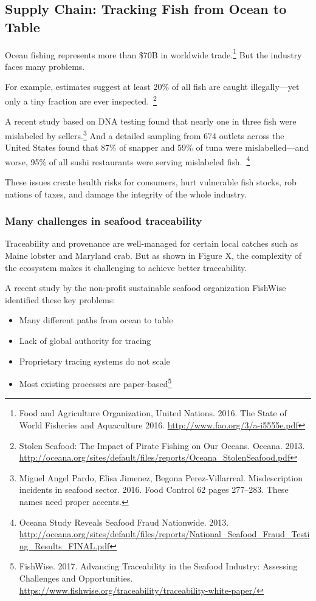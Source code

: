\subsection{Supply Chain: Tracking Fish from Ocean to Table}

Ocean fishing represents more than \$70B in worldwide trade.\footnote{
Food and Agriculture Organization, United Nations. 2016. The State of
World Fisheries and Aquaculture
2016. \url{http://www.fao.org/3/a-i5555e.pdf}} But the industry faces
many problems.

For example, estimates suggest at least 20\% of all fish are caught
illegally---yet only a tiny fraction are ever inspected.~\footnote{
Stolen Seafood: The Impact of Pirate Fishing on Our
Oceans. Oceana. 2013. \url{http://oceana.org/sites/default/files/reports/Oceana_StolenSeafood.pdf}}

A recent study based on DNA testing found that nearly one in three fish
were mislabeled by sellers.\footnote{ Miguel Angel Pardo, Elisa
Jimenez, Begona Perez-Villarreal. Misdescription incidents in
seafood sector. 2016. Food Control 62 pages 277--283. These names need
proper accents.}  And a detailed sampling from 674 outlets across the
United States found that 87\% of snapper and 59\% of tuna were
mislabelled---and worse, 95\% of all sushi restaurants were serving
mislabeled fish.~\footnote{ Oceana Study Reveals Seafood Fraud
Nationwide. 2013. \url{http://oceana.org/sites/default/files/reports/National_Seafood_Fraud_Testing_Results_FINAL.pdf}}

These issues create health risks for consumers, hurt vulnerable fish
stocks, rob nations of taxes, and damage the integrity of the whole
industry.

\subsubsection{Many challenges in seafood traceability}

Traceability and provenance are well-managed for certain local catches
such as Maine lobster and Maryland crab.  But as shown in Figure X, the
complexity of the ecosystem makes it challenging to achieve better
traceability.

A recent study by the non-profit sustainable seafood organization FishWise identified these key problems:
\begin{itemize}
\item Many different paths from ocean to table
\item Lack of global authority for tracing
\item Proprietary tracing systems do not scale
\item Most existing processes are paper-based\footnote { FishWise. 2017. Advancing Traceability in the Seafood Industry: Assessing Challenges and Opportunities. \url{https://www.fishwise.org/traceability/traceability-white-paper/}}
\end{itemize}

